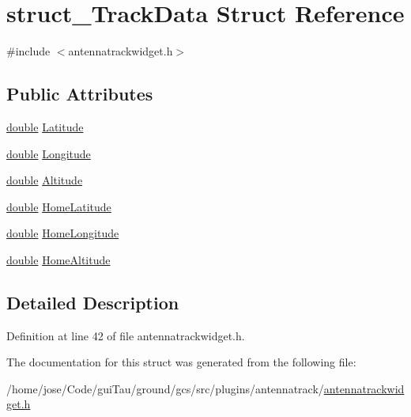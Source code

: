 \hypertarget{structstruct___track_data}{\section{struct\-\_\-\-Track\-Data Struct Reference}
\label{structstruct___track_data}
}


{\ttfamily \#include $<$antennatrackwidget.\-h$>$}

\subsection*{Public Attributes}
\begin{DoxyCompactItemize}
\item 
\hyperlink{_super_l_u_support_8h_a8956b2b9f49bf918deed98379d159ca7}{double} \hyperlink{group___antenna_track_gadget_plugin_ga412a0215352cff81241572b0637ca6d5}{Latitude}
\item 
\hyperlink{_super_l_u_support_8h_a8956b2b9f49bf918deed98379d159ca7}{double} \hyperlink{group___antenna_track_gadget_plugin_gadd67067451f9adf6f25e45bcb7498a32}{Longitude}
\item 
\hyperlink{_super_l_u_support_8h_a8956b2b9f49bf918deed98379d159ca7}{double} \hyperlink{group___antenna_track_gadget_plugin_ga528ec049631eed362529f9ea5fd30b99}{Altitude}
\item 
\hyperlink{_super_l_u_support_8h_a8956b2b9f49bf918deed98379d159ca7}{double} \hyperlink{group___antenna_track_gadget_plugin_gad25500d6984ee3227abe9b2663c0a975}{Home\-Latitude}
\item 
\hyperlink{_super_l_u_support_8h_a8956b2b9f49bf918deed98379d159ca7}{double} \hyperlink{group___antenna_track_gadget_plugin_ga297bb9a225f2fa6033327e0d99bc5eac}{Home\-Longitude}
\item 
\hyperlink{_super_l_u_support_8h_a8956b2b9f49bf918deed98379d159ca7}{double} \hyperlink{group___antenna_track_gadget_plugin_ga0bb6374ee3a9a6f864fbd03a1c791256}{Home\-Altitude}
\end{DoxyCompactItemize}


\subsection{Detailed Description}


Definition at line 42 of file antennatrackwidget.\-h.



The documentation for this struct was generated from the following file\-:\begin{DoxyCompactItemize}
\item 
/home/jose/\-Code/gui\-Tau/ground/gcs/src/plugins/antennatrack/\hyperlink{antennatrackwidget_8h}{antennatrackwidget.\-h}\end{DoxyCompactItemize}
